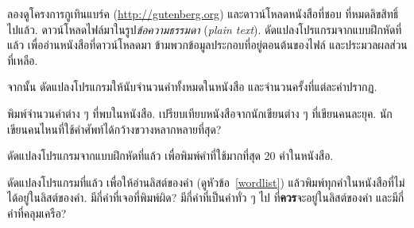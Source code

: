 \begin{exercise}


ลองดูโครงการกูเทินแบร์ค (\url{http://gutenberg.org})
และดาวน์โหลดหนังสือที่ชอบ ที่หมดลิขสิทธิ์ไปแล้ว.
ดาวน์โหลดไฟล์มาในรูป\textit{ข้อความธรรมดา} (\textit{plain text}).
%
%
ดัดแปลงโปรแกรมจากแบบฝึกหัดที่แล้ว เพื่ออ่านหนังสือที่ดาวน์โหลดมา
ข้ามพวกข้อมูลประกอบที่อยู่ตอนต้นของไฟล์
และประมวลผลส่วนที่เหลือ.
%

จากนั้น ดัดแปลงโปรแกรมให้นับจำนวนคำทั้งหมดในหนังสือ
และจำนวนครั้งที่แต่ละคำปรากฏ.
%

พิมพ์จำนวนคำต่าง ๆ ที่พบในหนังสือ.
เปรียบเทียบหนังสือจากนักเขียนต่าง ๆ ที่เขียนคนละยุค.
นักเขียนคนไหนที่ใช้คำศัพท์ได้กว้างขวางหลากหลายที่สุด?
\\
\end{exercise}


\begin{exercise}

%
ดัดแปลงโปรแกรมจากแบบฝึกหัดที่แล้ว
เพื่อพิมพ์คำที่ใช้มากที่สุด 20 คำในหนังสือ.
\\
\end{exercise}


\begin{exercise}

%
ดัดแปลงโปรแกรมที่แล้ว เพื่อให้อ่านลิสต์ของคำ (ดูหัวข้อ~\ref{wordlist})
แล้วพิมพ์ทุกคำในหนังสือที่ไม่ได้อยู่ในลิสต์ของคำ.
มีกี่คำที่เจอที่พิมพ์ผิด?
มีกี่คำที่เป็นคำทั่ว ๆ ไป ที่\textbf{ควร}จะอยู่ในลิสต์ของคำ 
และมีกี่คำที่คลุมเครือ?
\\
\end{exercise}


